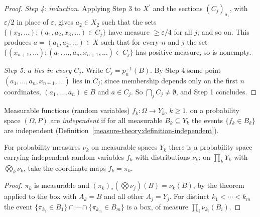 \begin{proof}
\emph{Step 4: induction.} Applying Step 3 to $X^{\prime}$ and the sections $(C_j)_{a_1}$, with $\varepsilon/2$ in place of $\varepsilon$, gives $a_2 \in X_2$ such that the sets
$\{(x_3, \ldots) : (a_1, a_2, x_3, \ldots) \in C_j\}$ have measure $\geq \varepsilon/4$ for all $j$; and so on. This produces $a = (a_1, a_2, \ldots) \in X$ such that for every $n$ and $j$ the set
$\{(x_{n+1}, \ldots) : (a_1, \ldots, a_n, x_{n+1}, \ldots) \in C_j\}$ has positive measure, so is nonempty.

\emph{Step 5: $a$ lies in every $C_j$.} Write $C_j = p_n^{-1}(B)$. By Step 4 some point $(a_1, \ldots, a_n, x_{n+1}, \ldots)$ lies in $C_j$; since membership depends only on the first $n$ coordinates,
$(a_1, \ldots, a_n) \in B$ and $a \in C_j$. So $\bigcap_jC_j \neq \emptyset$, and Step 1 concludes.
\end{proof}

\begin{definition}\label{measure-theory:definition-independent-variables}
Measurable functions (random variables) $f_k \colon \Omega \to Y_k$, $k \geq 1$, on a probability space $(\Omega, P)$ are \emph{independent} if for all measurable $B_k \subseteq Y_k$ the events
$\{f_k \in B_k\}$ are independent (Definition~\ref{measure-theory:definition-independent}).
\end{definition}

\begin{corollary}\label{measure-theory:corollary-independent-sequences}
For probability measures $\nu_k$ on measurable spaces $Y_k$ there is a probability space carrying independent random variables $f_k$ with distributions $\nu_k$: on $\prod_kY_k$ with
$\bigotimes_k\nu_k$, take the coordinate maps $f_k = \pi_k$.
\end{corollary}

\begin{proof}
$\pi_k$ is measurable and $(\pi_k)_*(\bigotimes\nu_j)(B) = \nu_k(B)$, by the theorem applied to the box with $A_k = B$ and all other $A_j = Y_j$. For distinct $k_1 < \cdots < k_m$ the event
$\{\pi_{k_1} \in B_1\} \cap \cdots \cap \{\pi_{k_m} \in B_m\}$ is a box, of measure $\prod_i\nu_{k_i}(B_i)$.
\end{proof}

